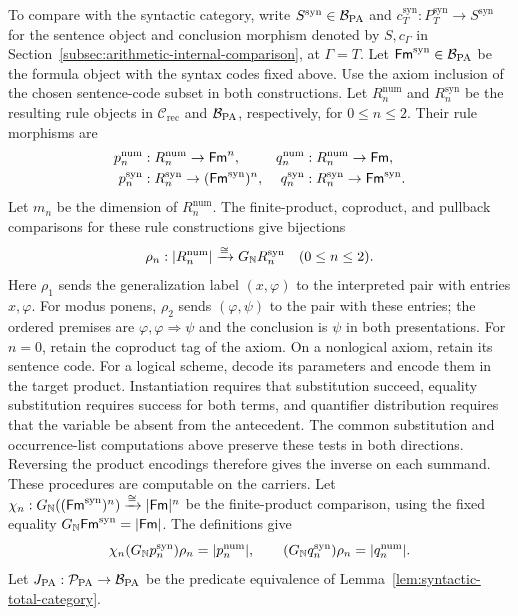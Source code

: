 To compare with the syntactic category, write
$S^{\mathrm{syn}}\in\mathcal B_{\mathrm{PA}}$ and
$c_T^{\mathrm{syn}}:P_T^{\mathrm{syn}}\to S^{\mathrm{syn}}$
for the sentence object and conclusion morphism denoted by $S,c_\Gamma$
in Section~\ref{subsec:arithmetic-internal-comparison}, at $\Gamma=T$.
Let $\mathsf{Fm}^{\mathrm{syn}}\in\mathcal B_{\mathrm{PA}}$ be the formula object
with the syntax codes fixed above. Use the axiom inclusion of the
chosen sentence-code subset in both constructions. Let
$R_n^{\mathrm{num}}$ and $R_n^{\mathrm{syn}}$ be the resulting
rule objects in $\mathcal C_{\mathrm{rec}}$ and $\mathcal B_{\mathrm{PA}}$,
respectively, for $0\le n\le2$. Their rule morphisms are
\[
 \begin{aligned}
 p_n^{\mathrm{num}}&:R_n^{\mathrm{num}}\to\mathsf{Fm}^n,&
 q_n^{\mathrm{num}}&:R_n^{\mathrm{num}}\to\mathsf{Fm},\\
 p_n^{\mathrm{syn}}&:R_n^{\mathrm{syn}}\to(\mathsf{Fm}^{\mathrm{syn}})^n,&
 q_n^{\mathrm{syn}}&:R_n^{\mathrm{syn}}\to\mathsf{Fm}^{\mathrm{syn}}.
 \end{aligned}
\]
Let $m_n$ be the dimension of $R_n^{\mathrm{num}}$.
The finite-product, coproduct, and pullback comparisons for these
rule constructions give bijections
\[
 \rho_n:|R_n^{\mathrm{num}}|\xrightarrow{\cong}
                  G_{\mathbb N}R_n^{\mathrm{syn}}\quad(0\le n\le2).
\]
Here $\rho_1$ sends the generalization label $(x,\varphi)$ to the
interpreted pair with entries $x,\varphi$. For modus ponens,
$\rho_2$ sends $(\varphi,\psi)$ to the pair with these entries;
the ordered premises are $\varphi,\varphi\Rightarrow\psi$ and the
conclusion is $\psi$ in both presentations.
For $n=0$, retain the coproduct tag of the axiom.
On a nonlogical axiom, retain its sentence code.
For a logical scheme, decode its parameters and encode them in the
target product. Instantiation requires that substitution succeed,
equality substitution requires success for both terms, and quantifier
distribution requires that the variable be absent from the antecedent.
The common substitution and occurrence-list computations above
preserve these tests in both directions. Reversing the product
encodings therefore gives the inverse on each summand. These
procedures are computable on the carriers. Let
$\chi_n:G_{\mathbb N}((\mathsf{Fm}^{\mathrm{syn}})^n)\xrightarrow{\cong}|\mathsf{Fm}|^n$
be the finite-product comparison, using the fixed equality
$G_{\mathbb N}\mathsf{Fm}^{\mathrm{syn}}=|\mathsf{Fm}|$. The definitions give
\[
 \chi_n(G_{\mathbb N}p_n^{\mathrm{syn}})\rho_n=|p_n^{\mathrm{num}}|,
 \qquad
 (G_{\mathbb N}q_n^{\mathrm{syn}})\rho_n=|q_n^{\mathrm{num}}|.
\]
Let $J_{\mathrm{PA}}:\mathcal P_{\mathrm{PA}}\to\mathcal B_{\mathrm{PA}}$ be the
predicate equivalence of Lemma~\ref{lem:syntactic-total-category}.
